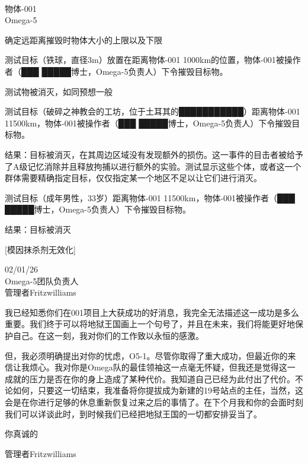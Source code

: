 \begin{scpboxbbwm}
\hr

\\
物体-001\\
Omega-5

确定远距离摧毁时物体大小的上限以及下限

测试目标（铁球，直径3m）放置在距离物体-001 1000km的位置，物体-001被操作者（███ █████博士，Omega-5负责人）下令摧毁目标物。

测试物被消灭，如同预想一般

测试目标（破碎之神教会的工坊，位于土耳其的███████████）距离物体-001 11500km，物体-001被操作者（███ █████博士，Omega-5负责人）下令摧毁目标物。

结果：目标被消灭，在其周边区域没有发现额外的损伤。这一事件的目击者被给予了A级记忆消除并且释放拘捕以进行额外的实验。测试显示这些个体，或者这一个群体需要精确指定目标，仅仅指定某一个地区不足以让它们进行消灭。

测试目标（成年男性，33岁）距离物体-001 11500km，物体-001被操作者（███ █████博士，Omega-5负责人）下令摧毁目标物。

结果：目标被消灭

\end{scpboxbbwm}




\begin{scpboxc}
{[模因抹杀剂无效化]}
\end{scpboxc}

\begin{scpbox}

02/01/26\\
Omega-5团队负责人\\
管理者Fritzwilliams

我已经知悉你们在001项目上大获成功的好消息，我完全无法描述这一成功是多么重要。我们终于可以将地狱王国画上一个句号了，并且在未来，我们将能更好地保护自己。在这一刻，我对你们的工作致以永恒的感激。

但，我必须明确提出对你的忧虑，O5-1。尽管你取得了重大成功，但最近你的来信让我烦心。我对你是Omega队的最佳领袖这一点毫无怀疑，但我还是觉得这一成就的压力是否在你的身上造成了某种代价。我知道自己已经为此付出了代价。不论如何，只要这一切结束，我准备将你提拔成为新建的19号站点的主任，当然，这会是在你进行足够的休息重新恢复过来之后的事情了。在下个月我和你的会面时刻我们可以详谈此时，到时候我们已经把地狱王国的一切都安排妥当了。

你真诚的

管理者Fritzwilliams

\end{scpbox}

